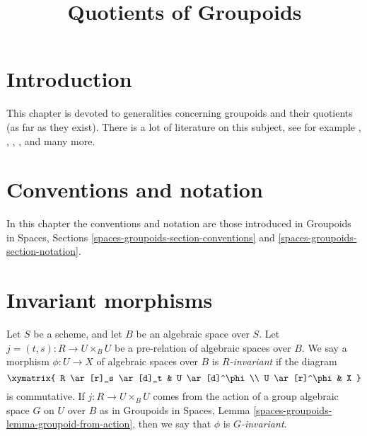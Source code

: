 

%


\title{Quotients of Groupoids}


\maketitle

\label{section-phantom}

\tableofcontents

\section{Introduction}
\label{section-introduction}

\noindent
This chapter is devoted to generalities concerning groupoids and their
quotients (as far as they exist).
There is a lot of literature on this subject, see for example
\cite{GIT}, \cite{seshadri_quotients}, \cite{KollarQuotients},
\cite{K-M}, \cite{KollarFinite} and many more.





\section{Conventions and notation}
\label{section-conventions-notation}

\noindent
In this chapter the conventions and notation are those introduced in
Groupoids in Spaces, Sections \ref{spaces-groupoids-section-conventions}
and \ref{spaces-groupoids-section-notation}.


\section{Invariant morphisms}
\label{section-invariant}

\begin{definition}
\label{definition-invariant}
Let $S$ be a scheme, and let $B$ be an algebraic space over $S$.
Let $j = (t, s) : R \to U \times_B U$ be a pre-relation of algebraic
spaces over $B$. We say a morphism $\phi : U \to X$ of algebraic spaces
over $B$ is {\it $R$-invariant} if the diagram
$$
\xymatrix{
R \ar[r]_s \ar[d]_t & U \ar[d]^\phi \\
U \ar[r]^\phi & X
}
$$
is commutative. If $j : R \to U \times_B U$ comes from the action
of a group algebraic space $G$ on $U$ over $B$ as in
Groupoids in Spaces, Lemma \ref{spaces-groupoids-lemma-groupoid-from-action},
then we say that $\phi$ is {\it $G$-invariant}.
\end{definition}

